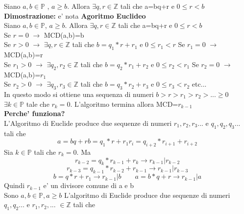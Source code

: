 \documentclass{article}
\begin{document}
    \begin{flushleft}
      Siano $a,b \in \mathbb{P}$ , $a\geq b$. Allora $\exists q,r \in \mathbb{Z}$ tali che a=bq+r e $0\leq r <b$ \\ 
      \textbf{Dimostrazione:} e' nota
      \textbf{Agoritmo Euclideo}\\       
      Siano $a,b \in \mathbb{P}$, $a\geq b$. Allora $\exists q,r \in \mathbb{Z}$ tali che a=bq+r e $0\leq r <b$ \\
      Se $r=0$ $\to$ MCD(a,b)=b \\ 
      Se $r>0$ $\to$ $\exists  q,r \in \mathbb{Z}$ tali che $b=q_1*r+r_1$ e $0\leq r_1 <r$
      Se $r_1=0$ $\to$ MCD(a,b)=r \\ 
      Se $r_1>0$ $\to$ $\exists  q_2,r_2 \in \mathbb{Z}$ tali che $b=q_2*r_1+r_2$ e $0\leq r_2 <r_1$
      Se $r_2=0$ $\to$ MCD(a,b)=$r_1$ \\ 
      Se $r_2>0$ $\to$ $\exists  q_3,r_3 \in \mathbb{Z}$ tali che $b=q_3*r_2+r_3$ e $0\leq r_3 <r_2$ etc... \\ 
      In questo modo si ottiene una sequenza di numeri $b>r>r_1>r_2>...\geq 0$ \\ 
      $\exists k \in \mathbb{P}$ tale che $r_k=0$. L'algoritmo termina allora MCD=$r_{k-1}$ \\ 
      \textbf{Perche' funziona?} \\ 
      L'Algoritmo di Euclide produce due sequenze di numeri $r_1,r_2,r_3...$ e $q_1,q_2,q_3...$ tali che
        \begin{equation}
           a = bq +r  
           b= q_1*r+r_1  
           r_i = q_{i+2}*r_{i+1} + r_{i+2} %
        \end{equation}
        Sia $k\in \mathbb{P}$ tali che $r_k=0$. Ma
        \begin{equation}
          r_{k-2}=q_k*r_{k-1} + r_k \to r_{k-1}|r_{k-2} 
        \end{equation}
        \begin{equation}
          r_{k-3}=q_{k-1}*r_{k-2} + r_{k-1} \to r_{k-1}|r_{k-3} 
        \end{equation}
        \begin{equation}
          b=q*r+r_1 \to r_{k-1}|b \quad \quad a=b*q+r\to r_{k-1}|a 
        \end{equation}
        Quindi $r_{k-1}$ e' un divisore comune di a e b
        \\
        Sono $a,b \in \mathbb{P}, a\geq b$ L'algoritmo di Euclide produce due sequenze di numeri $q_1,q_2...$ e $r_1,r_2,...$ $\in \mathbb{Z}$ tali che 

\end{flushleft}
\end{document}
